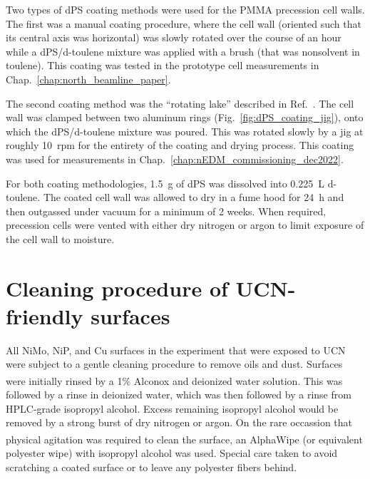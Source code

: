 Two types of dPS coating methods were used for the PMMA precession cell walls. The first was a manual coating procedure, where the cell wall (oriented such that its central axis was horizontal) was slowly rotated over the course of an hour while a dPS/d-toulene mixture was applied with a brush (that was nonsolvent in toulene). This coating was tested in the prototype cell measurements in Chap.~\ref{chap:north_beamline_paper}.

The second coating method was the ``rotating lake'' described in Ref.~\cite{bodek_storage_2008}. The cell wall was clamped between two aluminum rings (Fig.~\ref{fig:dPS_coating_jig}), onto which the dPS/d-toulene mixture was poured. This was rotated slowly by a jig at roughly \qty{10}{rpm} for the entirety of the coating and drying process. This coating was used for measurements in Chap.~\ref{chap:nEDM_commissioning_dec2022}.

For both coating methodologies, \qty{1.5}{\gram} of dPS was dissolved into \qty{0.225}{\liter} d-toulene. The coated cell wall was allowed to dry in a fume hood for \qty{24}{\hour} and then outgassed under vacuum for a minimum of 2 weeks. When required, precession cells were vented with either dry nitrogen or argon to limit exposure of the cell wall to moisture.


\section{Cleaning procedure of UCN-friendly surfaces}


All NiMo, NiP, and Cu surfaces in the experiment that were exposed to UCN were subject to a gentle cleaning procedure to remove oils and dust. Surfaces were initially rinsed by a 1\% Alconox\textsuperscript{\textregistered} and deionized water solution. This was followed by a rinse in deionized water, which was then followed by a rinse from HPLC-grade isopropyl alcohol. Excess remaining isopropyl alcohol would be removed by a strong burst of dry nitrogen or argon. On the rare occassion that physical agitation was required to clean the surface, an AlphaWipe\textsuperscript{\textregistered} (or equivalent polyester wipe) with isopropyl alcohol was used. Special care taken to avoid scratching a coated surface or to leave any polyester fibers behind.
